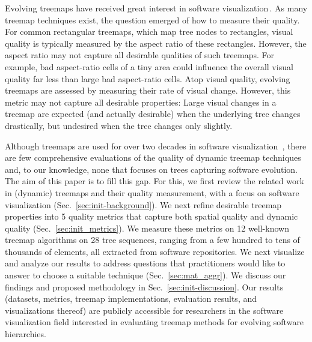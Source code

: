Evolving treemaps have received great interest in software visualization\,\citep{diehl08,hees17,hahn10,fisher10,gotz11}. As many treemap techniques exist, the question emerged of how to measure their quality. For common rectangular treemaps, which map tree nodes to rectangles, visual quality is typically measured by the aspect ratio of these rectangles. However, the aspect ratio may not capture all desirable qualities of such treemaps. For example, bad aspect-ratio cells of a tiny area could influence the overall visual quality far less than large bad aspect-ratio cells. Atop visual quality, evolving treemaps are assessed by measuring their rate of visual change. However, this metric may not capture all desirable properties: Large visual changes in a treemap are expected (and actually desirable) when the underlying tree changes drastically, but undesired when the tree changes only slightly.

Although treemaps are used for over two decades in software visualization~\citep{shneiderman92,schulz11_treesurvey,treevis,landesberger11}, there are few comprehensive evaluations of the quality of dynamic treemap techniques and, to our knowledge, none that focuses on trees capturing software evolution. The aim of this paper is to fill this gap. For this, we first review the related work in (dynamic) treemaps and their quality measurement, with a focus on software visualization (Sec.~\ref{sec:init-background}). We next refine desirable treemap properties into 5 quality metrics that capture both spatial quality and dynamic quality (Sec.~\ref{sec:init_metrics}). We measure these metrics on 12 well-known treemap algorithms on 28 tree sequences, ranging from a few hundred to tens of thousands of elements, all extracted from software repositories. We next visualize and analyze our results to address questions that practitioners would like to answer to choose a suitable technique (Sec.~\ref{sec:mat_aggr}). We discuss our findings and proposed methodology in Sec.~\ref{sec:init-discussion}. Our results (datasets, metrics, treemap implementations, evaluation results, and visualizations thereof) are publicly accessible for researchers in the software visualization field interested in evaluating treemap methods for evolving software hierarchies.


